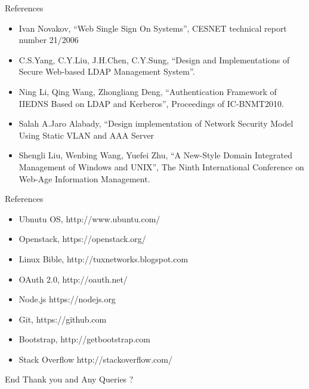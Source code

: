 \documentclass[xcolor=dvipsnames]{beamer}
\begin{document}
\begin{frame}{References}
\small
\begin{itemize}
\item Ivan Novakov, ``Web Single Sign On Systems'', CESNET technical report number 21/2006
\item C.S.Yang, C.Y.Liu, J.H.Chen, C.Y.Sung, ``Design and Implementations of Secure Web-based LDAP Management System''.
\item Ning Li, Qing Wang, Zhongliang Deng, ``Authentication Framework of IIEDNS Based on LDAP and Kerberos'', Proceedings of IC-BNMT2010.
\item Salah A.Jaro Alabady, ``Design implementation of Network Security Model Using Static VLAN and AAA Server
\item Shengli Liu, Wenbing Wang, Yuefei Zhu, ``A New-Style Domain Integrated Management of Windows and UNIX'', The Ninth International Conference on Web-Age Information Management.
\end{itemize}
\end{frame}

\begin{frame}{References}
\small
\begin{itemize}
\item Ubnutu OS, http://www.ubuntu.com/
\item Openstack, https://openstack.org/
\item Linux Bible, http://tuxnetworks.blogspot.com
\item OAuth 2.0, http://oauth.net/
\item Node.js https://nodejs.org
\item Git, https://github.com
\item Bootstrap, http://getbootstrap.com 
\item Stack Overflow http://stackoverflow.com/
\end{itemize}
\end{frame}

\begin{frame}{End}
Thank you and Any Queries ?
\end{frame}
\end{document}
